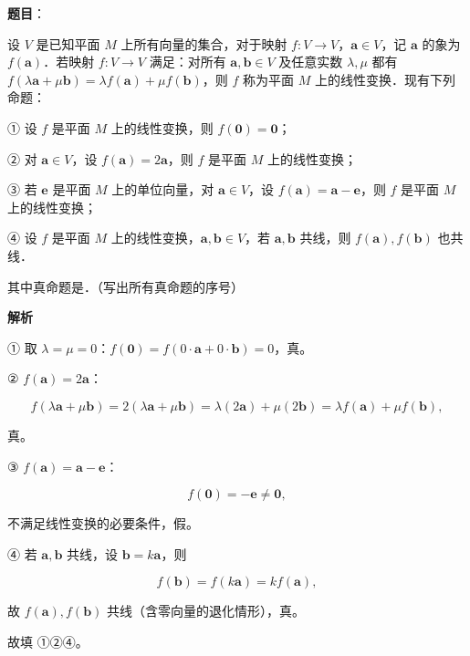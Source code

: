 \begin{answer}

\textbf{题目}：

设 $V$ 是已知平面 $M$ 上所有向量的集合，对于映射 $f:V\to V$，$\boldsymbol a\in V$，记 $\boldsymbol a$ 的象为 $f(\boldsymbol a)$．若映射 $f:V\to V$ 满足：对所有 $\boldsymbol a,\boldsymbol b\in V$ 及任意实数 $\lambda,\mu$ 都有 $f(\lambda\boldsymbol a+\mu\boldsymbol b)=\lambda f(\boldsymbol a)+\mu f(\boldsymbol b)$，则 $f$ 称为平面 $M$ 上的线性变换．现有下列命题：

① 设 $f$ 是平面 $M$ 上的线性变换，则 $f(\boldsymbol 0)=\boldsymbol 0$；

② 对 $\boldsymbol a\in V$，设 $f(\boldsymbol a)=2\boldsymbol a$，则 $f$ 是平面 $M$ 上的线性变换；

③ 若 $\boldsymbol e$ 是平面 $M$ 上的单位向量，对 $\boldsymbol a\in V$，设 $f(\boldsymbol a)=\boldsymbol a-\boldsymbol e$，则 $f$ 是平面 $M$ 上的线性变换；

④ 设 $f$ 是平面 $M$ 上的线性变换，$\boldsymbol a,\boldsymbol b\in V$，若 $\boldsymbol a,\boldsymbol b$ 共线，则 $f(\boldsymbol a),f(\boldsymbol b)$ 也共线．

其中真命题是\gkblank{}．（写出所有真命题的序号）

\textbf{解析}

① 取 $\lambda=\mu=0$：$f(\boldsymbol 0)=f(0\cdot\boldsymbol a+0\cdot\boldsymbol b)=0$，真。

② $f(\boldsymbol a)=2\boldsymbol a$：

\nopagebreak[4]
\[f(\lambda\boldsymbol a+\mu\boldsymbol b)=2(\lambda\boldsymbol a+\mu\boldsymbol b)
=\lambda(2\boldsymbol a)+\mu(2\boldsymbol b)
=\lambda f(\boldsymbol a)+\mu f(\boldsymbol b),\]

真。

③ $f(\boldsymbol a)=\boldsymbol a-\boldsymbol e$：

\nopagebreak[4]
\[f(\boldsymbol 0)=-\boldsymbol e\neq\boldsymbol 0,\]

不满足线性变换的必要条件，假。

④ 若 $\boldsymbol a,\boldsymbol b$ 共线，设 $\boldsymbol b=k\boldsymbol a$，则

\nopagebreak[4]
\[f(\boldsymbol b)=f(k\boldsymbol a)=kf(\boldsymbol a),\]

故 $f(\boldsymbol a),f(\boldsymbol b)$ 共线（含零向量的退化情形），真。

故填 ①②④。


\end{answer}
